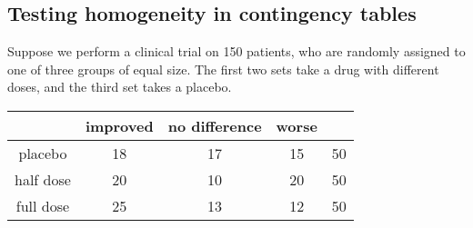 \subsection{Testing homogeneity in contingency tables}
\begin{example}
	Suppose we perform a clinical trial on 150 patients, who are randomly assigned to one of three groups of equal size.
	The first two sets take a drug with different doses, and the third set takes a placebo.

	\begin{center}
		\begin{tabular}{c | c c c | c}
			          & improved & no difference & worse &    \\\hline
			placebo   & 18       & 17            & 15    & 50 \\
			half dose & 20       & 10            & 20    & 50 \\
			full dose & 25       & 13            & 12    & 50
		\end{tabular}
	\end{center}


\end{example}
